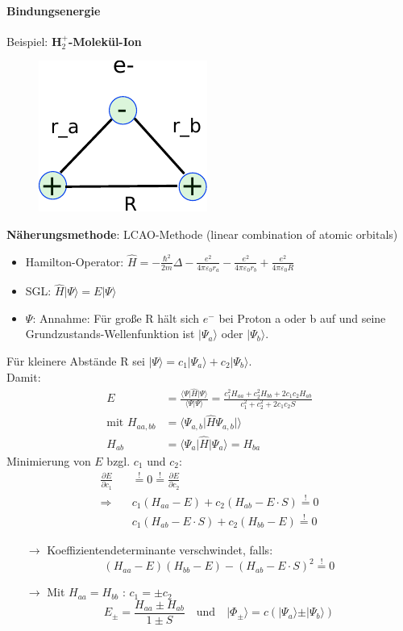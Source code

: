 \paragraph{Bindungsenergie}
Beispiel: \textbf{H$_2^+$-Molekül-Ion}
\begin{figure}[H]
	\centering
	\includegraphics{figures/1_4WasserstoffH2O.pdf}
	\caption{}
	\label{}
\end{figure}
\textbf{Näherungsmethode}: LCAO-Methode (linear combination of atomic orbitals)
\begin{itemize}
	\item Hamilton-Operator: $\hat H = - \frac{\hbar^2}{2m} \Delta - \frac{e^2}{4 \pi \varepsilon_0 r_a} - \frac{e^2}{4 \pi \varepsilon_0 r_b} +\frac{e^2}{4 \pi \varepsilon_0 R}$
	\item SGL: $\hat H \vert\Psi\rangle = E \vert\Psi\rangle$
	\item $\Psi$: Annahme: Für große R hält sich $e^-$ bei Proton a oder b auf und seine Grundzustands-Wellenfunktion ist $\vert\Psi_a\rangle$ oder $\vert\Psi_b\rangle$.\\
\end{itemize}
Für kleinere Abstände R sei $\vert\Psi\rangle = c_1 \vert\Psi_a\rangle + c_2 \vert\Psi_b\rangle$. \\
Damit:
\begin{align*}
	E &= \frac{\langle\Psi\vert\hat{H}\vert\Psi\rangle}{\langle\Psi\vert\Psi\rangle} = \frac{c_1^2 H_{aa} + c_2^2 H_{bb} + 2 c_1 c_2 H_{ab}}{c_1^2 + c_2^2 + 2 c_1 c_2 S}\\
	\text{mit } H_{aa,bb} &= \langle\Psi_{a,b}\vert\hat{H}\Psi_{a,b}\vert\rangle\\  
	H_{ab} &= \langle\Psi_a\vert\hat{H}\vert\Psi_a\rangle = H_{ba}
\end{align*}
Minimierung von $E$ bzgl. $c_1$ und $c_2$:
\begin{align*}
	\frac{\partial E}{\partial c_1} &\stackrel{!}{=} 0 \stackrel{!}{=} \frac{\partial E}{\partial c_2}\\
	\Rightarrow \quad &c_1(H_{aa}-E)+c_2(H_{ab}-E\cdot S) \stackrel{!}{=} 0\\
	&c_1(H_{ab}-E\cdot S)+c_2(H_{bb}-E) \stackrel{!}{=} 0
\end{align*}
\begin{itemize}
	\item[$\rightarrow$] Koeffizientendeterminante verschwindet, falls:
	$$ (H_{aa}-E)(H_{bb}-E) - (H_{ab}-E \cdot S)^2 \stackrel{!}{=} 0 $$
	\item[$\rightarrow$] Mit $H_{aa} = H_{bb}$ : $c_1 = \pm c_2 $
	$$E_{\pm} = \frac{H_{aa} \pm H_{ab}}{1 \pm S} \quad \text{und} \quad \vert\Phi_{\pm}\rangle = c (\vert\Psi_a\rangle \pm \vert\Psi_b\rangle) $$
\end{itemize}

